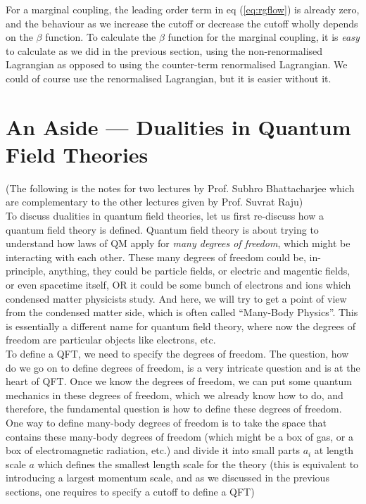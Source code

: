 \documentclass[11pt]{article}
\numberwithin{equation}{section}
\begin{document}
For a marginal coupling, the leading order term in eq (\ref{eq:rgflow}) is already zero, and the behaviour as we increase the cutoff or decrease the cutoff wholly depends on the \(\beta\) function. To calculate the \(\beta\) function for the marginal coupling, it is \textit{easy} to calculate as we did in the previous section, using the non-renormalised Lagrangian as opposed to using the counter-term renormalised Lagrangian. We could of course use the renormalised Lagrangian, but it is easier without it. 



\newpage
\section{An Aside — Dualities in Quantum Field Theories}
(The following is the notes for two lectures by Prof. Subhro Bhattacharjee which are complementary to the other lectures given by Prof. Suvrat Raju)\\

To discuss dualities in quantum field theories, let us first re-discuss how a quantum field theory is defined. Quantum field theory is about trying to understand how laws of QM apply for \textit{many degrees of freedom}, which might be interacting with each other. These many degrees of freedom could be, in-principle, anything, they could be particle fields, or electric and magentic fields, or even spacetime itself, OR it could be some bunch of electrons and ions which condensed matter physicists study. And here, we will try to get a point of view from the condensed matter side, which is often called ``Many-Body Physics''. This is essentially a different name for quantum field theory, where now the degrees of freedom are particular objects like electrons, etc.\\

To define a QFT, we need to specify the degrees of freedom. The question, how do we go on to define degrees of freedom, is a very intricate question and is at the heart of QFT. Once we know the degrees of freedom, we can put some quantum mechanics in these degrees of freedom, which we already know how to do, and therefore, the fundamental question is how to define these degrees of freedom. One way to define many-body degrees of freedom is to take the space that contains these many-body degrees of freedom (which might be a box of gas, or a box of electromagnetic radiation, etc.) and divide it into small parts \(a_i\) at length scale \(a\) which defines the smallest length scale for the theory (this is equivalent to introducing a largest momentum scale, and as we discussed in the previous sections, one requires to specify a cutoff to define a QFT)
\end{document}
